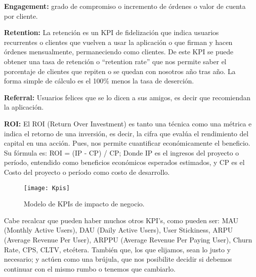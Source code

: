 \begin{description}
  \item {\textbf{Engagement:} grado de compromiso o incremento de órdenes o valor de cuenta por cliente.
}

  \item {\textbf{Retention:} La retención es un KPI de fidelización que indica usuarios recurrentes o clientes que vuelven a usar la aplicación o que firman y hacen órdenes mensualmente, permaneciendo como clientes. De este KPI se puede obtener una tasa de retención o “retention rate” que nos permite saber el porcentaje de clientes que repiten o se quedan con nosotros año tras año. La forma simple de cálculo es el 100\% menos la tasa de deserción.
}

  \item {\textbf{Referral:} Usuarios felices que se lo dicen a sus amigos, es decir que recomiendan la aplicación.
}

  \item {\textbf{ROI:} El ROI (Return Over Investment) es tanto una técnica como una métrica e indica el retorno de una inversión, es decir, la cifra que evalúa el rendimiento del capital en una acción. Pues, nos permite cuantificar económicamente el beneficio. Su fórmula es: ROI = (IP - CP) / CP; Donde IP es el ingresos del proyecto o período, entendido como beneficios económicos esperados estimados, y CP es el Costo del proyecto o período como costo de desarrollo.
}

\end{description}

\begin{figure}[h]
  \centering
  \texttt{[image: Kpis]}
  \caption{Modelo de KPIs de impacto de negocio.}
  \centering
  \label{fig:Kpis} %
\end{figure}
\FloatBarrier %


Cabe recalcar que pueden haber muchos otros KPI’s, como pueden ser: MAU (Monthly Active Users), DAU (Daily Active Users), User Stickiness, ARPU (Average Revenue Per User), ARPPU (Average Revenue Per Paying User), Churn Rate, CPS, CLTV, etcétera. También que, los que elijamos, sean lo justo y necesario; y actúen como una brújula, que nos posibilite decidir si debemos continuar con el mismo rumbo o tenemos que cambiarlo.

